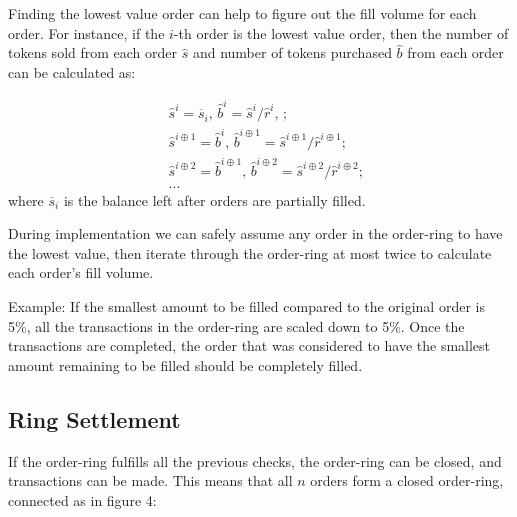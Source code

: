 \documentclass[UTF8,nofonts]{article}
\makeatletter
\newenvironment{figurehere}
 {\def\@captype{figure}}
 {}
\makeatother
\begin{document}
\begin{multicols}{2}
Finding the lowest value order can help to figure out the fill volume for each order. For instance, if the $i$-th order is the lowest value order, then the number of tokens sold from each order $\hat{s}$ and number of tokens purchased $\hat{b}$ from each order can be calculated as:

\[
\begin{split}
&\hat{s}^{i}=\overline{s}_i\text{, } \hat{b}^{i}=\hat{s}^{i}/ \hat{r}^i\text{, }\text{;}\\
&\hat{s}^{i\oplus 1}=\hat{b}^i\text{, } \hat{b}^{i\oplus 1}=\hat{s}^{i\oplus 1}/ \hat{r}^{i\oplus 1}\text{;}\\
&\hat{s}^{i\oplus 2}=\hat{b}^{i\oplus 1}\text{, } \hat{b}^{i\oplus 2}=\hat{s}^{i\oplus 2}/ \hat{r}^{i\oplus 2}\text{;}\\
& ...
\end{split}
\]
where $\overline{s}_i$ is the balance left after orders are partially filled.

During implementation we can safely assume any order in the order-ring to have the lowest value, then iterate through the order-ring at most twice to calculate each order's fill volume. 

Example: If the smallest amount to be filled compared to the original order is 5\%, all the transactions in the order-ring are scaled down to 5\%. Once the transactions are completed, the order that was considered to have the smallest amount remaining to be filled should be completely filled.

\subsection{Ring Settlement\label{sec:settlement}}

If the order-ring fulfills all the previous checks, the order-ring can be closed, and transactions can be made. This means that all $n$ orders form a closed order-ring, connected as in figure 4:

\begin{center}
\begin{figurehere}
\centering
{}
\end{figurehere}
\end{center}
\end{multicols}
\end{document}
